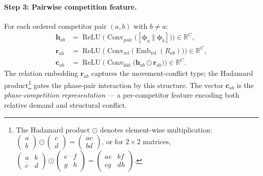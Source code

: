 \paragraph{Step 3: Pairwise competition feature.}
For each ordered competitor pair $(a, b)$ with $b \ne a$:
\begin{align}
  \mathbf{h}_{ab} &=
    \operatorname{ReLU}\!\bigl(
      \operatorname{Conv}_{\text{pair}}\bigl([\boldsymbol{\phi}_a \;\Vert\; \boldsymbol{\phi}_b]\bigr)
    \bigr) \in \mathbb{R}^{C}, \label{eq:frap_h} \\
  \mathbf{r}_{ab} &=
    \operatorname{ReLU}\!\bigl(
      \operatorname{Conv}_{\text{rel}}\bigl(\operatorname{Emb}_{\text{rel}}(R_{ab})\bigr)
    \bigr) \in \mathbb{R}^{C}, \label{eq:frap_r} \\
  \mathbf{c}_{ab} &=
    \operatorname{ReLU}\!\bigl(
      \operatorname{Conv}_{\text{hid}}\bigl(\mathbf{h}_{ab} \odot \mathbf{r}_{ab}\bigr)
    \bigr) \in \mathbb{R}^C. \label{eq:frap_c}
\end{align}
The relation embedding $\mathbf{r}_{ab}$ captures the movement-conflict type; the Hadamard product\footnote{The Hadamard product $\odot$ denotes element-wise multiplication: $\begin{pmatrix}a\\b\end{pmatrix}\odot\begin{pmatrix}c\\d\end{pmatrix}=\begin{pmatrix}ac\\bd\end{pmatrix}$, or for $2\times2$ matrices, $\begin{pmatrix}a&b\\c&d\end{pmatrix}\odot\begin{pmatrix}e&f\\g&h\end{pmatrix}=\begin{pmatrix}ae&bf\\cg&dh\end{pmatrix}$.} gates the phase-pair interaction by this structure. The vector $\mathbf{c}_{ab}$ is the \emph{phase-competition representation} — a per-competitor feature encoding both relative demand and structural conflict.

